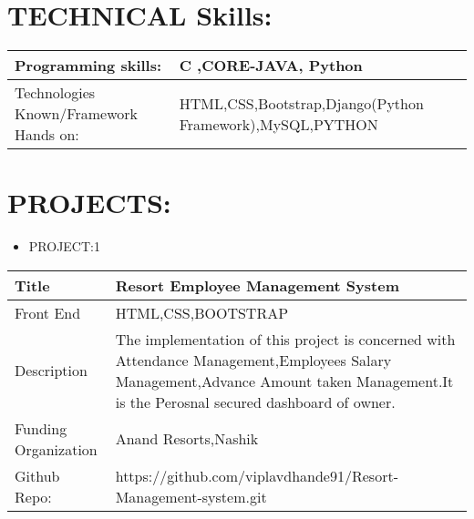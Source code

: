 \documentclass[a4paper,10pt]{article}
\begin{document}
\vspace{5mm}











\section{TECHNICAL Skills:}

\begin{tabu} to 0.8\textwidth { | X[l] | X[l] |  }
 \hline
 \large  Programming skills:  & C ,CORE-JAVA, Python\\
 
 \hline
\large  Technologies Known/Framework Hands on:  &   HTML,CSS,Bootstrap,Django(Python Framework),MySQL,PYTHON   \\
  


\hline
\end{tabu}






\section{PROJECTS:}

\renewcommand{\labelitemi}{$\blacksquare$}
 
 
 \begin{itemize}
   \item {\large PROJECT:1}
   
 \end{itemize}


\begin{tabu} to 0.9\textwidth { | X[l] | X[2.5] | }
 \hline
 \large Title & Resort Employee Management System\\
 
 \hline
\large Front End  & HTML,CSS,BOOTSTRAP\\
 
\hline
\large Description & The implementation of this project is concerned with Attendance Management,Employees Salary Management,Advance Amount taken Management.It is the Perosnal secured dashboard of owner. \\
\hline
\large Funding Organization & Anand Resorts,Nashik \\
\hline

\large Github Repo: & https://github.com/viplavdhande91/Resort-Management-system.git \\
 

 
\hline
\end{tabu}
 
\end{document}
